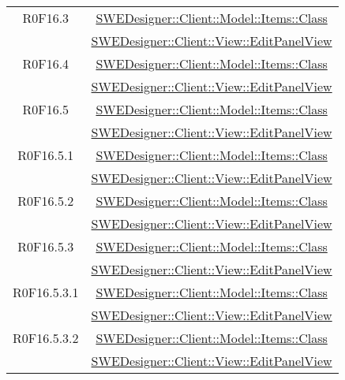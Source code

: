 \documentclass[../DefinizioneDiProdotto.tex]{subfiles}
\begin{document}
\begin{longtable}{|c|c|}
				R0F16.3
				& \hyperlink{SWEDesigner::Client::Model::Items::Class}{SWEDesigner::Client::Model::Items::Class}\\
				& \hyperlink{SWEDesigner::Client::View::EditPanelView}{SWEDesigner::Client::View::EditPanelView}\\
				\hline

				R0F16.4
				& \hyperlink{SWEDesigner::Client::Model::Items::Class}{SWEDesigner::Client::Model::Items::Class}\\
				& \hyperlink{SWEDesigner::Client::View::EditPanelView}{SWEDesigner::Client::View::EditPanelView}\\
				\hline

				R0F16.5
				& \hyperlink{SWEDesigner::Client::Model::Items::Class}{SWEDesigner::Client::Model::Items::Class}\\
				& \hyperlink{SWEDesigner::Client::View::EditPanelView}{SWEDesigner::Client::View::EditPanelView}\\
				\hline

				R0F16.5.1
				& \hyperlink{SWEDesigner::Client::Model::Items::Class}{SWEDesigner::Client::Model::Items::Class}\\
				& \hyperlink{SWEDesigner::Client::View::EditPanelView}{SWEDesigner::Client::View::EditPanelView}\\
				\hline

				R0F16.5.2
				& \hyperlink{SWEDesigner::Client::Model::Items::Class}{SWEDesigner::Client::Model::Items::Class}\\
				& \hyperlink{SWEDesigner::Client::View::EditPanelView}{SWEDesigner::Client::View::EditPanelView}\\
				\hline

				R0F16.5.3
				& \hyperlink{SWEDesigner::Client::Model::Items::Class}{SWEDesigner::Client::Model::Items::Class}\\
				& \hyperlink{SWEDesigner::Client::View::EditPanelView}{SWEDesigner::Client::View::EditPanelView}\\
				\hline

				R0F16.5.3.1
				& \hyperlink{SWEDesigner::Client::Model::Items::Class}{SWEDesigner::Client::Model::Items::Class}\\
				& \hyperlink{SWEDesigner::Client::View::EditPanelView}{SWEDesigner::Client::View::EditPanelView}\\
				\hline

				R0F16.5.3.2
				& \hyperlink{SWEDesigner::Client::Model::Items::Class}{SWEDesigner::Client::Model::Items::Class}\\
				& \hyperlink{SWEDesigner::Client::View::EditPanelView}{SWEDesigner::Client::View::EditPanelView}\\
				\hline


\end{longtable}
\end{document}
